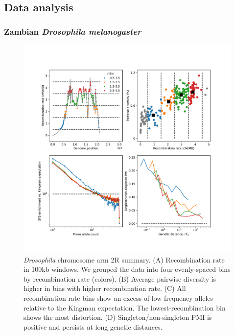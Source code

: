 \documentclass[11pt, letterpaper]{article}   	%
\begin{document}
\subsection{Data analysis}

\subsubsection{Zambian \textit{Drosophila melanogaster}}
\begin{figure}
\centering
\includegraphics[width=\textwidth]{figures/chr2R_summary.pdf}
\caption{\textit{Drosophila} chromosome arm 2R summary. (A) Recombination rate in 100kb windows. We grouped the data into four evenly-spaced bins by recombination rate (colors). (B) Average pairwise diversity is higher in bins with higher recombination rate. (C) All recombination-rate bins show an excess of low-frequency alleles relative to the Kingman expectation. The lowest-recombination bin shows the most distortion. (D) Singleton/non-singleton PMI is positive and persists at long genetic distances. \label{fig:drosophila}}
\end{figure}
\end{document}
